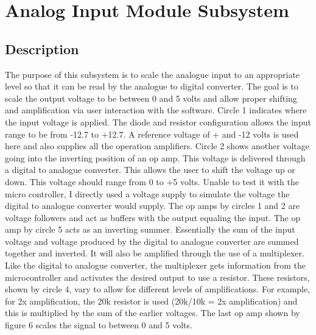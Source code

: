 \section[Analog Input]{Analog Input Module Subsystem}
\subsection{Description}
	The purpose of this subsystem is to scale the analogue input to an 
appropriate level so that it can be read by the analogue to digital converter.
The goal is to scale the output voltage to be between 0 and 5 volts and allow 
proper shifting and amplification via user interaction with the software. 
Circle 1 indicates where the input voltage is applied. The diode and resistor
 configuration allows the input range to be from -12.7 to +12.7. A reference 
voltage of + and -12 volts is used here and also supplies all the operation 
amplifiers. Circle 2 shows another voltage going into the inverting
 position of an op amp. This voltage is delivered through a digital to 
analogue converter. This allows the user to shift the voltage up or down. This
 voltage should range from 0 to +5 volts. Unable to test it with the micro 
controller, I directly used a voltage supply to simulate the voltage the 
digital to analogue converter would supply. The op amps by circles 1 and 2 
are voltage followers and act as buffers with the output equaling the input. 
The op amp by circle 5 acts as an inverting summer. Essentially the sum of the 
input voltage and voltage produced by the digital to analogue converter are 
summed together and inverted. It will also be amplified through the use of a 
multiplexer. Like the digital to analogue converter, the multiplexer gets 
information from the microcontroller and activates the desired output to use a 
resistor. These resistors, shown by circle 4, vary to allow for different
 levels of amplifications. For example, for 2x amplification, the 20k resistor 
is used (20k/10k = 2x amplification) and this is multiplied by the sum of the 
earlier voltages. The last op amp shown by figure 6 scales the signal to 
between 0 and 5 volts.
